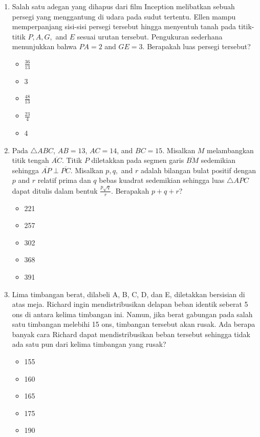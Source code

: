\documentclass[12pt]{scrartcl}
\begin{document}
\begin{enumerate}
    \item Salah satu adegan yang dihapus dari film Inception melibatkan sebuah persegi yang menggantung di udara pada sudut tertentu. Ellen mampu memperpanjang sisi-sisi persegi tersebut hingga menyentuh tanah pada titik-titik $P, A, G,$ and $E$ sesuai urutan tersebut. Pengukuran sederhana menunjukkan bahwa $PA=2$ and $GE=3$. Berapakah luas persegi tersebut?
    \begin{itemize}
        \item[(A)] $\frac{36}{13}$
        \item[(B)] 3
        \item[(C)] $\frac{48}{13}$
        \item[(D)] $\frac{23}{4}$
        \item[(E)] 4
    \end{itemize}

    \item Pada $\triangle ABC$, $AB=13$, $AC=14$, and $BC=15$. Misalkan $M$ melambangkan titik tengah $\overline{AC}$. Titik $P$ diletakkan pada segmen garis $\overline{BM}$ sedemikian sehingga $\overline{AP}\perp\overline{PC}$. Misalkan $p, q,$ and $r$ adalah bilangan bulat positif dengan $p$ and $r$ relatif prima dan $q$ bebas kuadrat sedemikian sehingga luas $\triangle APC$ dapat ditulis dalam bentuk $\frac{p\sqrt{q}}{r}$. Berapakah $p+q+r$?
    \begin{itemize}
        \item[(A)] 221
        \item[(B)] 257
        \item[(C)] 302
        \item[(D)] 368
        \item[(E)] 391
    \end{itemize}

    \item Lima timbangan berat, dilabeli A, B, C, D, dan E, diletakkan bersisian di atas meja. Richard ingin mendistribusikan delapan beban identik seberat 5 ons di antara kelima timbangan ini. Namun, jika berat gabungan pada salah satu timbangan melebihi 15 ons, timbangan tersebut akan rusak. Ada berapa banyak cara Richard dapat mendistribusikan beban tersebut sehingga tidak ada satu pun dari kelima timbangan yang rusak?
    \begin{itemize}
        \item[(A)] 155
        \item[(B)] 160
        \item[(C)] 165
        \item[(D)] 175
        \item[(E)] 190
    \end{itemize}


\end{enumerate}
\end{document}
